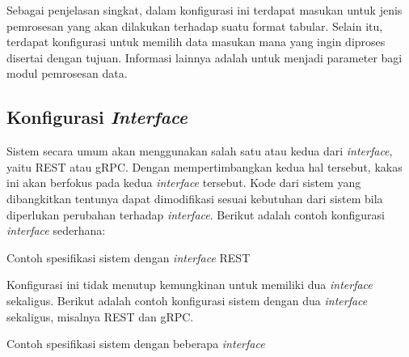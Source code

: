 Sebagai penjelasan singkat, dalam konfigurasi ini terdapat masukan untuk jenis pemrosesan yang akan dilakukan terhadap suatu format tabular.
Selain itu, terdapat konfigurasi untuk memilih data masukan mana yang ingin diproses disertai dengan tujuan.
Informasi lainnya adalah untuk menjadi parameter bagi modul pemrosesan data. 

\subsection{Konfigurasi \textit{Interface}}\label{section:03-interface-config}
Sistem secara umum akan menggunakan salah satu atau kedua dari \textit{interface}, yaitu REST atau gRPC.
Dengan mempertimbangkan kedua hal tersebut, kakas ini akan berfokus pada kedua \textit{interface} tersebut.
Kode dari sistem yang dibangkitkan tentunya dapat dimodifikasi sesuai kebutuhan dari sistem bila diperlukan perubahan terhadap \textit{interface}.
Berikut adalah contoh konfigurasi \textit{interface} sederhana:

\begin{listing}[H]
	\caption{Contoh spesifikasi sistem dengan \textit{interface} REST}
	\label{listing:8}
\end{listing}

Konfigurasi ini tidak menutup kemungkinan untuk memiliki dua \textit{interface} sekaligus.
Berikut adalah contoh konfigurasi sistem dengan dua \textit{interface} sekaligus, misalnya REST dan gRPC.

\begin{listing}[H]
	\caption{Contoh spesifikasi sistem dengan beberapa \textit{interface}}
	\label{listing:9}
\end{listing}
